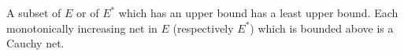 A subset of $E$ or of $E^*$ which has an upper bound has a least upper bound. Each monotonically increasing net in $E$ (respectively $E^*$) which is bounded above is a Cauchy net.
